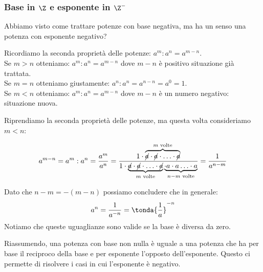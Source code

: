 % 

\subsubsection{Base in 
\texorpdfstring{$\Z$ e esponente in $\Z^-$}{Z e esponente in Z-}}

Abbiamo visto come trattare potenze con base negativa, ma ha un senso una 
potenza con esponente negativo?

Ricordiamo la seconda proprietà delle potenze: \(a^m : a^n = a^{m-n}\). \\
Se \(m > n\) otteniamo: \(a^m : a^n = a^{m-n}\) dove \(m-n\) è 
positivo situazione già trattata.\\
Se \(m = n\) otteniamo giustamente: \(a^n : a^n = a^{n-n} = a^0 = 1\).\\
Se \(m < n\) otteniamo: \(a^m : a^n = a^{m-n}\) dove \(m-n\) è 
un numero negativo: situazione nuova.

Riprendiamo la seconda proprietà delle potenze, ma questa volta 
consideriamo \(m < n\):

\[
 a^{m-n} = a^m: a^n = \frac{a^m}{a^n}=
 \frac{1 \cdot \overbrace{\cancel{a} \cdot \cancel{a} \cdot 
       \ldots \cdot \cancel{a}}^{m \text{ volte}}}
      {1 \cdot \underbrace{\cancel{a} \cdot \cancel{a} \cdot
                           \ldots \cdot \cancel{a}}_{m \text{ volte}} 
               \underbrace{\cdot a \cdot a \ldots 
                           \cdot a}_{n-m \text{ volte}}}=
 \frac{1}{a^{n-m}}
\]



Dato che \(n-m = -(m-n)\) possiamo concludere che in generale:
\[a^n = \frac{1}{a^{-n}} = \tonda{\frac{1}{a}}^{-n}\]
Notiamo che queste uguaglianze sono valide se la base è diversa da zero.

Riassumendo, una potenza con base non nulla è uguale a una potenza che ha 
per base il reciproco della base e per esponente l'opposto dell'esponente.
Questo ci permette di risolvere i casi in cui l'esponente è negativo.

